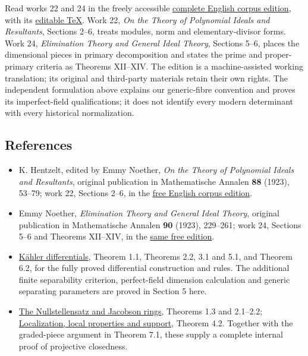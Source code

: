 \documentclass[
]{article}
\providecommand{\tightlist}{%
  \setlength{\itemsep}{0pt}\setlength{\parskip}{0pt}}
\begin{document}
Read works 22 and 24 in the freely accessible
\href{https://zenodo.org/records/21923146/preview/00_EMMY_NOETHER_EN_COMPLETE_LINKED_READER.pdf?include_deleted=0}{complete
English corpus edition}, with its
\href{https://raw.githubusercontent.com/KokunoYumeto/emmy-noether-en/main/source/Noether_English_ED0014.tex}{editable
TeX}. Work 22, \emph{On the Theory of Polynomial Ideals and Resultants},
Sections 2--6, treats modules, norm and elementary-divisor forms. Work
24, \emph{Elimination Theory and General Ideal Theory}, Sections 5--6,
places the dimensional pieces in primary decomposition and states the
prime and proper-primary criteria as Theorems XII--XIV. The edition is a
machine-assisted working translation; its original and third-party
materials retain their own rights. The independent formulation above
explains our generic-fibre convention and proves its imperfect-field
qualifications; it does not identify every modern determinant with every
historical normalization.

\subsection{References}\label{references}

\begin{itemize}
\tightlist
\item
  K. Hentzelt, edited by Emmy Noether, \emph{On the Theory of Polynomial
  Ideals and Resultants}, original publication in Mathematische Annalen
  \textbf{88} (1923), 53--79; work 22, Sections 2--6, in the
  \href{https://zenodo.org/records/21923146/preview/00_EMMY_NOETHER_EN_COMPLETE_LINKED_READER.pdf?include_deleted=0}{free
  English corpus edition}.
\item
  Emmy Noether, \emph{Elimination Theory and General Ideal Theory},
  original publication in Mathematische Annalen \textbf{90} (1923),
  229--261; work 24, Sections 5--6 and Theorems XII--XIV, in the
  \href{https://zenodo.org/records/21923146/preview/00_EMMY_NOETHER_EN_COMPLETE_LINKED_READER.pdf?include_deleted=0}{same
  free edition}.
\item
  \href{../prerequisites/AG-CA/AG-CA-16.html}{Kähler differentials},
  Theorem 1.1, Theorems 2.2, 3.1 and 5.1, and Theorem 6.2, for the fully
  proved differential construction and rules. The additional finite
  separability criterion, perfect-field dimension calculation and
  generic separating parameters are proved in Section 5 here.
\item
  \href{../prerequisites/AG-CA/AG-CA-06.html}{The Nullstellensatz and
  Jacobson rings}, Theorems 1.3 and 2.1--2.2;
  \href{../prerequisites/AG-CA/AG-CA-02.html}{Localization, local
  properties and support}, Theorem 4.2. Together with the graded-piece
  argument in Theorem 7.1, these supply a complete internal proof of
  projective closedness.
\end{itemize}
\end{document}
